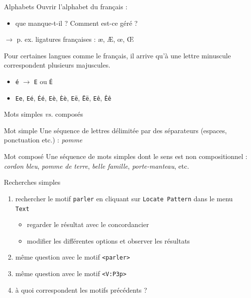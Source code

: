 \documentclass[xetex,xcolor={table,usenames,dvipsnames}]{beamer}
\begin{document}
\begin{frame}{Alphabets}
		Ouvrir l'alphabet du français :
	\begin{itemize}
		\item que manque-t-il ? Comment est-ce géré ?
	\end{itemize}
	
	$\rightarrow$ p. ex. ligatures françaises : \ae{}, \AE{}, \oe{}, \OE{}
	
	Pour certaines langues comme le français, il arrive qu’à une lettre minuscule correspondent plusieurs majuscules.
	\begin{itemize}
		\item \texttt{é} $\rightarrow$ \texttt{E} ou \texttt{É}
		\item[] \texttt{Ee}, \texttt{Eé}, \texttt{Éé}, \texttt{Eè}, \texttt{Èè}, \texttt{Eë}, \texttt{Ëë}, \texttt{Eê}, \texttt{Êê}
	\end{itemize}
\end{frame}



\begin{frame}{Mots simples \textit{vs.} composés}
	\begin{block}{Mot simple}
		Une séquence de lettres délimitée par des séparateurs (espaces, ponctuation etc.) : \textit{pomme}
	\end{block}
	
		\begin{block}{Mot composé}
		Une séquence de mots simples dont le sens est non compositionnel : \textit{cordon bleu}, \textit{pomme de terre}, \textit{belle famille}, \textit{porte-manteau}, etc.
	\end{block}
\end{frame}

\begin{frame}{Recherches simples}
	\begin{enumerate}
		\item rechercher le motif \texttt{parler} en cliquant sur \texttt{Locate Pattern} dans le menu \texttt{Text}
		\begin{itemize}
			\item regarder le résultat avec le concordancier
			\item modifier les différentes options et observer les résultats
		\end{itemize}
		\item même question avec le motif \texttt{<parler>}
		\item même question avec le motif \texttt{<V:P3p>}
		\item à quoi correspondent les motifs précédents ?
	\end{enumerate}
\end{frame}
\end{document}

